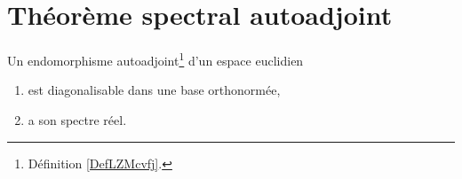\section{Théorème spectral autoadjoint}

\begin{theorem} \label{ThoRSBahHH}
	Un endomorphisme autoadjoint\footnote{Définition \ref{DefLZMcvfj}.} d'un espace euclidien
	\begin{enumerate}
		\item
		      est diagonalisable dans une base orthonormée,
		\item
		      a son spectre réel.
	\end{enumerate}
\end{theorem}

